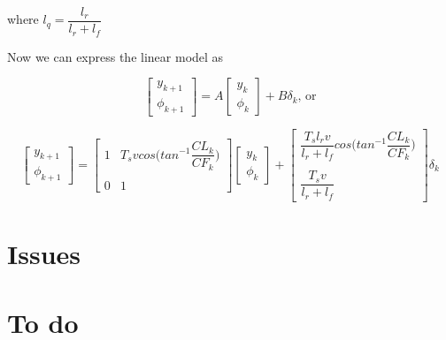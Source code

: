 \documentclass[oneside,12pt]{article}
\begin{document}
    where $l_q = \dfrac{l_r}{l_r + l_f}$




  Now we can express the linear model as

    \begin{equation}
      \begin{bmatrix}
        y_{k+1} \\
        \phi_{k+1}
      \end{bmatrix}
      =
       A
      \begin{bmatrix}
        y_{k} \\
        \phi_{k}
      \end{bmatrix}
      +
      B
      \delta_{k}\text{, or}
    \end{equation}

    \begin{equation}
      \begin{bmatrix}
        y_{k+1} \\
        \phi_{k+1}
      \end{bmatrix}
      =
      \begin{bmatrix}
        1 & T_s v cos\Big(tan^{-1}\dfrac{CL_k}{CF_k}\Big) \\\\
        0 & 1
      \end{bmatrix}
      \begin{bmatrix}
        y_{k} \\
        \phi_{k}
      \end{bmatrix}
      +
      \begin{bmatrix}
        \dfrac{T_s l_r v}{l_r + l_f} cos\Big(tan^{-1}\dfrac{CL_k}{CF_k}\Big) \\\\
        \dfrac{T_s v}{l_r+l_f}
      \end{bmatrix}
      \delta_{k}
    \end{equation}



\section{Issues}



\section{To do}
\end{document}
